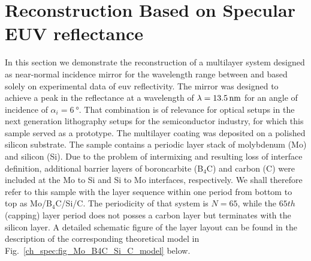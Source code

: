 % 



\section{Reconstruction Based on Specular EUV reflectance}
\label{ch_spec:sec_reconstruction_PTB17}
In this section we demonstrate the reconstruction of a multilayer system designed as near-normal incidence mirror for the wavelength range between  and  based solely on experimental data of \gls{euv} reflectivity. The mirror was designed to achieve a peak in the reflectance at a wavelength of $\lambda=\nm{13.5}$ for an angle of incidence of $\alpha_i = \SI{6}{\degree}$. That combination is of relevance for optical setups in the next generation lithography setups for the semiconductor industry, for which this sample served as a prototype. The multilayer coating was deposited on a polished silicon substrate. The sample contains a periodic layer stack of molybdenum (Mo) and silicon (Si). Due to the problem of intermixing and resulting loss of interface definition, additional barrier layers of boroncarbite (B$_4$C) and carbon (C) were included at the Mo to Si and Si to Mo interfaces, respectively. We shall therefore refer to this sample with the layer sequence within one period from bottom to top as Mo/B$_4$C/Si/C. The periodicity of that system is $N=65$, while the $65th$ (capping) layer period does not posses a carbon layer but terminates with the silicon layer. A detailed schematic figure of the layer layout can be found in the description of the corresponding theoretical model in Fig.~\ref{ch_spec:fig_Mo_B4C_Si_C_model} below.

